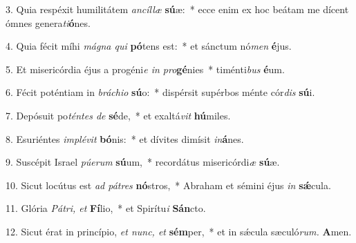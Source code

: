 \item 3. Quia respéxit humilitátem \textit{ancíllæ} \textbf{sú}æ:~* ecce enim ex hoc beátam me dícent ómnes genera\textit{ti}\textbf{ó}nes.

\item 4. Quia fécit míhi \textit{mágna qui} \textbf{pó}tens est:~* et sánctum nó\textit{men} \textbf{é}jus.

\item 5. Et misericórdia éjus a progéni\textit{e in pro}\textbf{gé}nies~* timénti\textit{bus} \textbf{é}um.

\item 6. Fécit poténtiam in \textit{bráchio} \textbf{sú}o:~* dispérsit supérbos ménte cór\textit{dis} \textbf{sú}i.

\item 7. Depósuit po\textit{téntes de} \textbf{sé}de,~* et exaltá\textit{vit} \textbf{hú}miles.

\item 8. Esuriéntes \textit{implévit} \textbf{bó}nis:~* et dívites dimísit \textit{in}\textbf{á}nes.

\item 9. Suscépit Israel \textit{púerum} \textbf{sú}um,~* recordátus misericórdi\textit{æ} \textbf{sú}æ.

\item 10. Sicut locútus est \textit{ad pátres} \textbf{nó}stros,~* Abraham et sémini éjus \textit{in} \textbf{sǽ}cula.

\item 11. Glória \textit{Pátri, et} \textbf{Fí}lio,~* et Spirítu\textit{i} \textbf{Sán}cto.

\item 12. Sicut érat in princípio, \textit{et nunc, et} \textbf{sém}per,~* et in sǽcula sæculó\textit{rum.} \textbf{A}men.
